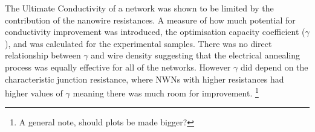 The Ultimate Conductivity of a network was shown to be limited by the contribution of the nanowire resistances. A measure of how much potential for conductivity improvement was introduced, the optimisation capacity coefficient ($\gamma$), and was calculated for the experimental samples. There was no direct relationship between $\gamma$ and wire density suggesting that the electrical annealing process was equally effective for all of the networks. However $\gamma$ did depend on the characteristic junction resistance, where NWNs with higher resistances had higher values of $\gamma$ meaning there was much room for improvement.
\footnote{A general note, should plots be made bigger?}




